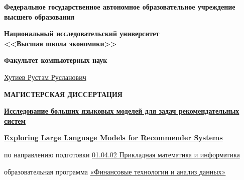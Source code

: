 
\begin{center}
    
    \textbf{Федеральное государственное автономное образовательное учреждение высшего образования}

    \textbf{Национальный исследовательский университет \\ <<Высшая школа экономики>>}

    \textbf{Факультет компьютерных наук}
\end{center}

\begin{center}
    \underline{Хутиев Рустэм Русланович}
\end{center}

\begin{center}
    \vspace{5ex}
    \textbf{МАГИСТЕРСКАЯ ДИССЕРТАЦИЯ}
    \vspace{3ex}
    
    \textbf{\underline{Исследование больших языковых моделей для задач рекомендательных систем}}

    \textbf{\underline{Exploring Large Language Models for Recommender Systems}}

    \vspace{3ex}
    по направлению подготовки  \underline{01.04.02 Прикладная математика и информатика}

    образовательная программа \underline{«Финансовые технологии и анализ данных»}
    
    \vspace{10ex}
\end{center}

